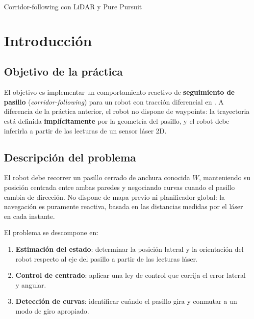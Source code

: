 \documentclass[12pt]{article}
\begin{document}
%
        {Corridor-following con LiDAR y Pure Pursuit}

\tableofcontents
\clearpage


\section{Introducci\'{o}n}

\subsection{Objetivo de la pr\'{a}ctica}
El objetivo es implementar un comportamiento reactivo de \textbf{seguimiento de pasillo} (\emph{corridor-following}) para un robot \pioneer{} con tracci\'{o}n diferencial en \coppelia{}. A diferencia de la pr\'{a}ctica anterior, el robot no dispone de waypoints: la trayectoria est\'{a} definida \textbf{impl\'{i}citamente} por la geometr\'{i}a del pasillo, y el robot debe inferirla a partir de las lecturas de un sensor l\'{a}ser 2D.

\subsection{Descripci\'{o}n del problema}
El robot debe recorrer un pasillo cerrado de anchura conocida $W$, manteniendo su posici\'{o}n centrada entre ambas paredes y negociando curvas cuando el pasillo cambia de direcci\'{o}n. No dispone de mapa previo ni planificador global: la navegaci\'{o}n es puramente reactiva, basada en las distancias medidas por el l\'{a}ser en cada instante.

El problema se descompone en:
\begin{enumerate}[leftmargin=2em]
  \item \textbf{Estimaci\'{o}n del estado}: determinar la posici\'{o}n lateral y la orientaci\'{o}n del robot respecto al eje del pasillo a partir de las lecturas l\'{a}ser.
  \item \textbf{Control de centrado}: aplicar una ley de control que corrija el error lateral y angular.
  \item \textbf{Detecci\'{o}n de curvas}: identificar cu\'{a}ndo el pasillo gira y conmutar a un modo de giro apropiado.
\end{enumerate}
\end{document}
